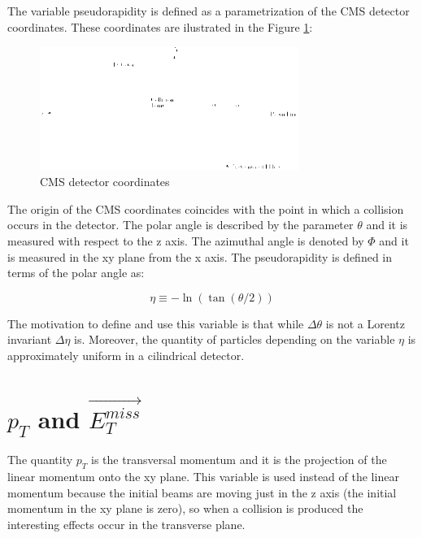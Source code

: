  The variable pseudorapidity is defined as a parametrization of the CMS detector coordinates. These coordinates are ilustrated in the Figure \ref{CMSCoordinates}:
 
 
 \begin{figure}[h] \label{CMSCoordinates}
 \centering
 \caption{CMS detector coordinates}
 \includegraphics[width=0.75\textwidth]{./Capitulos/VariableDefinitions/CMS_coordinates}  
 \end{figure}


The origin of the CMS coordinates coincides with the point in which a collision occurs in the detector. 
The polar angle is described by the parameter $\theta$ and it is measured with respect to the z axis.
The azimuthal angle is denoted by $\Phi$ and it is measured in the xy plane from the x axis. The pseudorapidity is defined in terms of the polar angle as:

\begin{equation}
 \eta \equiv - \ln \left( \tan (\theta /2 ) \right)
\end{equation}

 The motivation to define and use this variable is that while $\Delta \theta$ is not a Lorentz invariant $\Delta \eta$ is. Moreover, the quantity of particles depending on the variable $\eta$
 is approximately uniform in a cilindrical detector. 
 
  
 \section{$p_T$ and $\vec{E_T^{miss}}$}

 The quantity $p_T$ is the transversal momentum and it is the projection of the linear momentum onto the xy plane. This variable is used instead of the linear momentum because the initial beams
 are moving just in the z axis (the initial momentum in the xy plane is zero), so when a collision is produced the interesting effects occur in the transverse plane.\\
 

